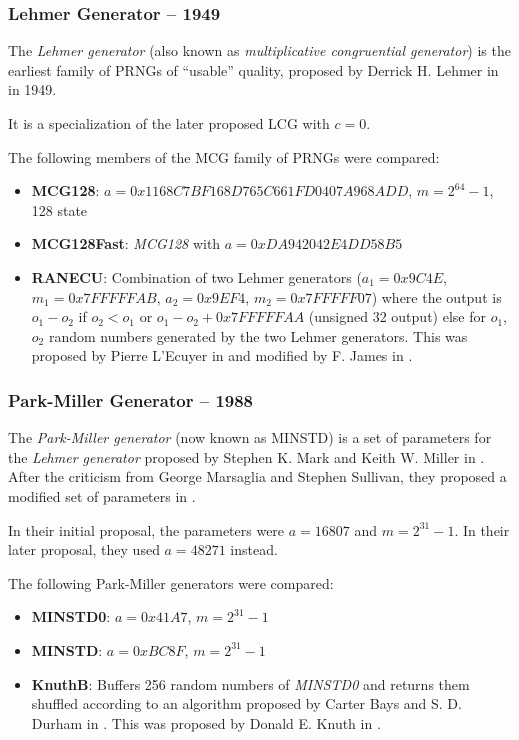 \subsubsection[Lehmer Generator (MCG) -- 1949]{Lehmer Generator -- 1949} \label{subsubsec:mcg}

    The \emph{Lehmer generator} (also known as \emph{multiplicative congruential generator}) is the earliest family of PRNGs of ``usable'' quality, proposed by Derrick H. Lehmer in \cite{Lehman:1951} in 1949.

    It is a specialization of the later proposed LCG with $c = 0$.

    The following members of the MCG family of PRNGs were compared:
    \begin{itemize}
		\itemsep0em
        \item \textbf{MCG128}:     $a = 0x1168C7BF168D765C661FD0407A968ADD$, $m = 2^{64} - 1$, \SI{128}{\bit} state
        \item \textbf{MCG128Fast}: \textit{MCG128} with $a = 0xDA942042E4DD58B5$
        \item \textbf{RANECU}: Combination of two Lehmer generators ($a_1 = 0x9C4E$, $m_1 = 0x7FFFFFAB$, $a_2 = 0x9EF4$, $m_2 = 0x7FFFFF07$) where the output is $o_1 - o_2$ if $o_2 < o_1$ or $o_1 - o_2 + 0x7FFFFFAA$ (unsigned \SI{32}{\bit} output) else for $o_1$, $o_2$ random numbers generated by the two Lehmer generators. This was proposed by Pierre L'Ecuyer in \cite{LEcuyer:1988} and modified by F. James in \cite{James:1990}.
    \end{itemize}

\subsubsection[Park-Miller Generator -- 1988]{Park-Miller Generator -- 1988} \label{subsubsec:minstd}

    The \emph{Park-Miller generator} (now known as MINSTD) is a set of parameters for the \emph{Lehmer generator} proposed by Stephen K. Mark and Keith W. Miller in \cite{Park:1988}. After the criticism from George Marsaglia and Stephen Sullivan, they proposed a modified set of parameters in \cite{Park:1993}.

    In their initial proposal, the parameters were $a = 16807$ and $m = 2^{31} - 1$. In their later proposal, they used $a = 48271$ instead.

    The following Park-Miller generators were compared:
    \begin{itemize}
		\itemsep0em
        \item \textbf{MINSTD0}: $a = 0x41A7$, $m = 2^{31} - 1$
        \item \textbf{MINSTD}:  $a = 0xBC8F$, $m = 2^{31} - 1$
        \item \textbf{KnuthB}: Buffers 256 random numbers of \textit{MINSTD0} and returns them shuffled according to an algorithm proposed by Carter Bays and S. D. Durham in \cite{Bays:1976}. This was proposed by Donald E. Knuth in \cite{Knuth:1981}.
    \end{itemize}

